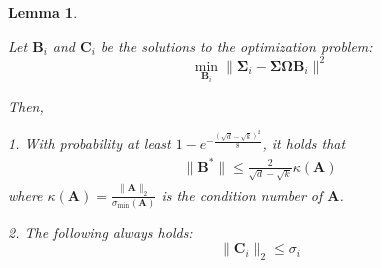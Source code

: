 \documentclass[conference]{IEEEtran}
\newcommand{\rk}[1]{\operatorname{rank}(#1)}
\newcommand{\bA}{\mathbf{A}}
\newcommand{\bB}{\mathbf{B}}
\newtheorem{remark}{Remark}
\newtheorem{lemma}{Lemma}
\begin{document}
\begin{lemma}\label{lm: solution_norm_bounds}
    

Let $\mathbf{B}_i$ and $\mathbf{C}_i$ be the solutions to the optimization problem:
$$\min_{\mathbf{B}_i} \|\boldsymbol{\Sigma}_i - \boldsymbol{\Sigma} \boldsymbol{\Omega} \mathbf{B}_i \|^2$$

Then, 

1. With probability at least $1 - e^{-\frac{(\sqrt{d}-\sqrt{k})^2}{8}}$, it holds that 
\begin{align}
    \|\bB^*\| \le \frac{2}{\sqrt{d} - \sqrt{k}}\kappa(\bA) 
\end{align}
where $\kappa(\bA) = \frac{\|\bA\|_2}{\sigma_{\min}(\bA)}$ is the condition number of $\bA$.

2. The following always holds:
   $$\|\mathbf{C}_i\|_2 \leq \sigma_i$$

\end{lemma}

\end{document}
